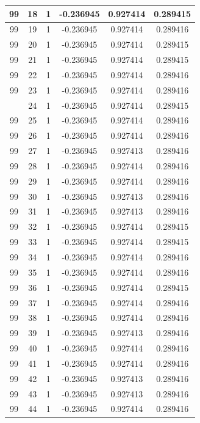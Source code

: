 \documentclass[12pt,a4paper]{article}
\numberwithin{equation}{section}
\numberwithin{figure}{section}
\numberwithin{table}{section}
\begin{document}
\begin{longtable}{|c|c|c|c|c|c|}
99 & 18 & 1 & -0.236945 & 0.927414 & 0.289415 \\ \hline
99 & 19 & 1 & -0.236945 & 0.927414 & 0.289416 \\ \hline
99 & 20 & 1 & -0.236945 & 0.927414 & 0.289415 \\ \hline
99 & 21 & 1 & -0.236945 & 0.927414 & 0.289415 \\ \hline
99 & 22 & 1 & -0.236945 & 0.927414 & 0.289416 \\ \hline
99 & 23 & 1 & -0.236945 & 0.927414 & 0.289416 \\ \hline
\pagebreak
99 & 24 & 1 & -0.236945 & 0.927414 & 0.289415 \\ \hline
99 & 25 & 1 & -0.236945 & 0.927414 & 0.289416 \\ \hline
99 & 26 & 1 & -0.236945 & 0.927414 & 0.289416 \\ \hline
99 & 27 & 1 & -0.236945 & 0.927413 & 0.289416 \\ \hline
99 & 28 & 1 & -0.236945 & 0.927414 & 0.289416 \\ \hline
99 & 29 & 1 & -0.236945 & 0.927414 & 0.289416 \\ \hline
99 & 30 & 1 & -0.236945 & 0.927413 & 0.289416 \\ \hline
99 & 31 & 1 & -0.236945 & 0.927413 & 0.289416 \\ \hline
99 & 32 & 1 & -0.236945 & 0.927414 & 0.289415 \\ \hline
99 & 33 & 1 & -0.236945 & 0.927414 & 0.289415 \\ \hline
99 & 34 & 1 & -0.236945 & 0.927414 & 0.289416 \\ \hline
99 & 35 & 1 & -0.236945 & 0.927414 & 0.289416 \\ \hline
99 & 36 & 1 & -0.236945 & 0.927414 & 0.289415 \\ \hline
99 & 37 & 1 & -0.236945 & 0.927414 & 0.289416 \\ \hline
99 & 38 & 1 & -0.236945 & 0.927414 & 0.289416 \\ \hline
99 & 39 & 1 & -0.236945 & 0.927413 & 0.289416 \\ \hline
99 & 40 & 1 & -0.236945 & 0.927414 & 0.289416 \\ \hline
99 & 41 & 1 & -0.236945 & 0.927414 & 0.289416 \\ \hline
99 & 42 & 1 & -0.236945 & 0.927413 & 0.289416 \\ \hline
99 & 43 & 1 & -0.236945 & 0.927413 & 0.289416 \\ \hline
99 & 44 & 1 & -0.236945 & 0.927414 & 0.289416 \\ \hline

\end{longtable}
\end{document}
